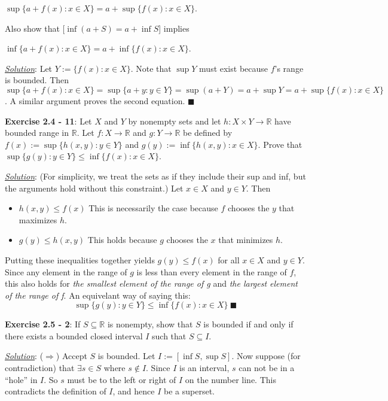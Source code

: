 \documentclass{article}
\begin{document}
\centerline{$\sup \{a + f(x) : x \in X\} = a + \sup \{f(x): x \in X\}$.}

Also show that [$\inf (a + S) = a + \inf S$] implies

\centerline{$\inf \{a + f(x) : x \in X\} = a + \inf \{f(x): x \in X\}$.}

\underline{\textit{Solution}}: Let $Y := \{f(x) : x \in X\}$. Note that
$\sup Y$ must exist because $f$'s range is bounded. Then $\sup \{a +
f(x) : x \in X\} = \sup \{a + y : y \in Y\} = \sup (a + Y) = a + \sup Y
= a + \sup \{f(x) : x \in X\}$. A similar argument proves the second
equation. $\blacksquare$

\hrulefill

\textbf{Exercise 2.4 - 11}: Let $X$ and $Y$ by nonempty sets and let $h: X
\times Y \rightarrow \mathbb{R}$ have bounded range in $\mathbb{R}$. Let
$f : X \rightarrow \mathbb{R}$ and $g : Y \rightarrow\mathbb{R}$ be defined
by $f(x):=\sup \{h(x,y) : y \in Y\}$ and $g(y) := \inf \{h(x,y) : x \in
X\}$. Prove that $\sup \{g(y) : y \in Y\} \leq \inf \{f(x) : x \in X\}$.

\underline{\textit{Solution}}:
(For simplicity, we treat the sets as if they include their sup and inf, but
the arguments hold without this constraint.) Let $x \in X$ and $y \in Y$. Then
\begin{itemize}
  \item $h(x,y) \leq f(x)$ This is necessarily the case because $f$ chooses
    the $y$ that maximizes $h$.
  \item $g(y) \leq h(x, y)$ This holds because $g$ chooses the $x$ that
    minimizes $h$.
\end{itemize}
Putting these inequalities together yields $g(y) \leq f(x)$ for all
$x \in X$ and $y \in Y$. Since any element in the range of $g$ is less than
every element in the range of $f$, this also holds for \textit{the smallest
element of the range of g} and \textit{the largest element of the range of
 f}. An equivelant way of saying this:
$$\sup \{g(y) : y \in Y\} \leq \inf \{f(x) : x \in X\}\ \blacksquare$$

\hrulefill

\textbf{Exercise 2.5 - 2}: If $S \subseteq \mathbb{R}$ is nonempty, show
that $S$ is bounded if and only if there exists a bounded closed interval
$I$ such that $S \subseteq I$.

\underline{\textit{Solution}}: 
($\Rightarrow$) Accept $S$ is bounded. Let $I := [\inf S, \sup S]$. Now
suppose (for contradiction) that $\exists s \in S$ where $s \notin I$.
Since $I$ is an interval, $s$ can not be in a ``hole'' in $I$. So $s$ must
be to the left or right of $I$ on the number line. This contradicts the
definition of $I$, and hence $I$ be a superset.
\end{document}
